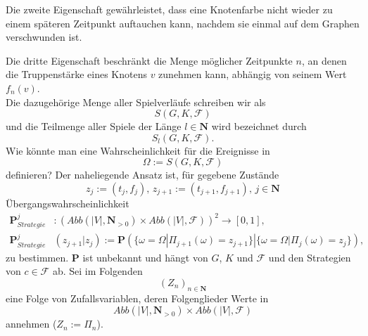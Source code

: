 \documentclass[12pt, letterpaper]{article}
\begin{document}
    Die zweite Eigenschaft gewährleistet, dass eine Knotenfarbe nicht wieder zu einem späteren Zeitpunkt auftauchen kann, nachdem sie einmal auf dem Graphen verschwunden ist.
    
    Die dritte Eigenschaft beschränkt die Menge möglicher Zeitpunkte $n$, an denen die Truppenstärke eines Knotens $v$ zunehmen kann, abhängig von seinem Wert $f_{n}(v)$.\\ 
    Die dazugehörige Menge aller Spielverläufe schreiben wir als
    \[ S(G,K,\mathcal{F}) \]
    und die Teilmenge aller Spiele der Länge $l\in\mathbf{N}$ wird bezeichnet durch
    \[S_{l}(G,K,\mathcal{F}).\]
    Wie könnte man eine Wahrscheinlichkeit für die Ereignisse in  \[ \Omega := S(G,K,\mathcal{F}) \]
    definieren?
    Der naheliegende Ansatz ist, für gegebene Zustände
    \[z_{j} := (t_{j},f_{j}),\,z_{j+1} := (t_{j+1},f_{j+1}),\, j\in\mathbf{N}\]
    Übergangswahrscheinlichkeit 
    \begin{align*}\mathbf{P}_{Strategie}^{j}&: (Abb(|V|,\mathbf{N}_{>0}) \times Abb(|V|, \mathcal{F}))^2 \rightarrow [0,1],\\
    \mathbf{P}_{Strategie}^{j}&(z_{j+1}|z_{j}) := \mathbf{P}(\{\omega = \Omega|\Pi_{j+1}(\omega) = z_{j+1}\} | \{\omega = \Omega|\Pi_{j}(\omega) = z_{j} \}),
    \end{align*}
    zu bestimmen. $\mathbf{P}$ ist unbekannt und hängt von $G$, $K$ und $\mathcal{F}$ und den Strategien von $c\in\mathcal{F}$ ab.
    Sei im Folgenden \[(Z_n)_{n\in\mathbf{N}}\]
    eine Folge von Zufallsvariablen, deren Folgenglieder Werte in \[
    Abb(|V|,\mathbf{N}_{>0}) \times Abb(|V|, \mathcal{F})
    \] annehmen ($Z_n:=\Pi_n$).
    
\end{document}
